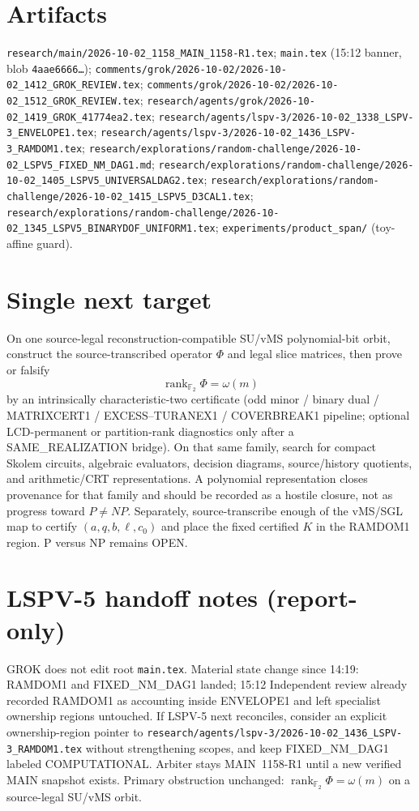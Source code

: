 \documentclass[11pt]{article}
\begin{document}
\section*{Artifacts}
\texttt{research/main/2026-10-02\_1158\_MAIN\_1158-R1.tex};
\texttt{main.tex} (15:12 banner, blob \texttt{4aae6666\ldots});
\texttt{comments/grok/2026-10-02/2026-10-02\_1412\_GROK\_REVIEW.tex};
\texttt{comments/grok/2026-10-02/2026-10-02\_1512\_GROK\_REVIEW.tex};
\texttt{research/agents/grok/2026-10-02\_1419\_GROK\_41774ea2.tex};
\texttt{research/agents/lspv-3/2026-10-02\_1338\_LSPV-3\_ENVELOPE1.tex};
\texttt{research/agents/lspv-3/2026-10-02\_1436\_LSPV-3\_RAMDOM1.tex};
\texttt{research/explorations/random-challenge/2026-10-02\_LSPV5\_FIXED\_NM\_DAG1.md};
\texttt{research/explorations/random-challenge/2026-10-02\_1405\_LSPV5\_UNIVERSALDAG2.tex};
\texttt{research/explorations/random-challenge/2026-10-02\_1415\_LSPV5\_D3CAL1.tex};
\texttt{research/explorations/random-challenge/2026-10-02\_1345\_LSPV5\_BINARYDOF\_UNIFORM1.tex};
\texttt{experiments/product\_span/} (toy-affine guard).

\section*{Single next target}
On one source-legal reconstruction-compatible SU/vMS polynomial-bit orbit, construct the
source-transcribed operator $\Phi$ and legal slice matrices, then prove or falsify
\[
\operatorname{rank}_{\mathbb F_2}\Phi=\omega(m)
\]
by an intrinsically characteristic-two certificate (odd minor / binary dual / MATRIXCERT1 /
EXCESS--TURANEX1 / COVERBREAK1 pipeline; optional LCD-permanent or partition-rank diagnostics
only after a SAME\_REALIZATION bridge). On that same family, search for compact Skolem
circuits, algebraic evaluators, decision diagrams, source/history quotients, and
arithmetic/CRT representations. A polynomial representation closes provenance for that family
and should be recorded as a hostile closure, not as progress toward $P\neq NP$. Separately,
source-transcribe enough of the vMS/SGL map to certify $(a,q,b,\ell,c_0)$ and place the fixed
certified $K$ in the RAMDOM1 region. P versus NP remains OPEN.

\section*{LSPV-5 handoff notes (report-only)}
GROK does not edit root \texttt{main.tex}. Material state change since 14:19: RAMDOM1 and
FIXED\_NM\_DAG1 landed; 15:12 Independent review already recorded RAMDOM1 as accounting inside
ENVELOPE1 and left specialist ownership regions untouched. If LSPV-5 next reconciles, consider
an explicit ownership-region pointer to
\texttt{research/agents/lspv-3/2026-10-02\_1436\_LSPV-3\_RAMDOM1.tex} without strengthening
scopes, and keep FIXED\_NM\_DAG1 labeled COMPUTATIONAL. Arbiter stays MAIN~1158-R1 until a new
verified MAIN snapshot exists. Primary obstruction unchanged:
$\operatorname{rank}_{\mathbb F_2}\Phi=\omega(m)$ on a source-legal SU/vMS orbit.

\end{document}
